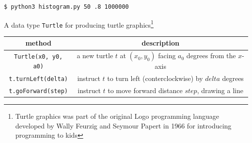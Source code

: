 \documentclass[8pt,a4paper,compress]{beamer}
\begin{document}
\begin{frame}[fragile]
\pause
\bigskip

\begin{minipage}{200pt}
\begin{lstlisting}[language={},style=focusin]
$ python3 histogram.py 50 .8 1000000
\end{lstlisting}
\end{minipage}%
\hfill
\begin{minipage}{100pt}
\begin{center}
\end{center}
\end{minipage}%
\end{frame}

\begin{frame}[fragile]
\pause

A data type \lstinline{Turtle} for producing turtle graphics\footnote{Turtle graphics was part of the original Logo programming language developed by Wally Feurzig and Seymour Papert in 1966 for introducing programming to kids}
\begin{center}
\begin{tabular}{cc}
method & description \\ \hline
\lstinline$Turtle(x0, y0, a0)$ & a new turtle $t$ at $(x_0, y_0)$ facing $a_0$ degrees from the $x$-axis \\
\lstinline$t.turnLeft(delta)$ & instruct $t$ to turn left (conterclockwise) by $delta$ degrees \\
\lstinline$t.goForward(step)$ & instruct $t$ to move forward distance $step$, drawing a line
\end{tabular} 
\end{center}
\end{frame}
\end{document}
